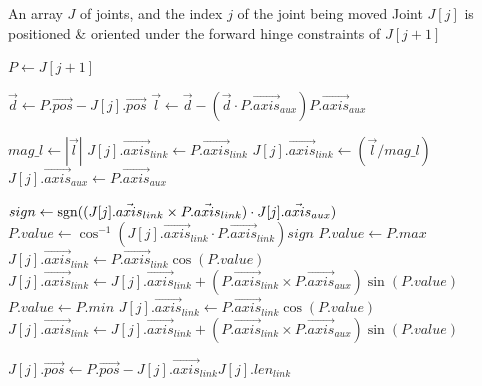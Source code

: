 \begin{algorithm}[h!]
\caption{Move Joint under Forward Hinge Constraints}
\label{alg:move_hinge}
\normalsize{
\begin{algorithmic}[1]
    \Require An array $J$ of joints, and the index $j$ of the joint being moved
    \Ensure Joint $J[j]$ is positioned \& oriented under the forward hinge constraints of $J[j+1]$

        \State $P\gets J[j+1]$
        \Statex

        \State $\vec{d}\gets P.\vec{pos}-J[j].\vec{pos}$
        \State $\vec{l}\gets\vec{d}-(\vec{d}\cdot P.\vec{axis}_{aux})P.\vec{axis}_{aux}$
        \Statex

        \State $mag\_l \gets |\vec{l}|$
            \State $J[j].\vec{axis}_{link}\gets P.\vec{axis}_{link}$
        \Else
            \State $J[j].\vec{axis}_{link}\gets (\vec{l}/mag\_l)$
        \EndIf
        \State $J[j].\vec{axis}_{aux}\gets P.\vec{axis}_{aux}$
        \Statex

        \State $sign\gets\operatorname{sgn}((J[j].\vec{axis}_{link}\times P.\vec{axis}_{link})\cdot J[j].\vec{axis}_{aux})$
        \State $P.value\gets\cos^{-1}(J[j].\vec{axis}_{link}\cdot P.\vec{axis}_{link})sign$
                \State $P.value\gets P.max$
                \State $J[j].\vec{axis}_{link}\gets P.\vec{axis}_{link}\cos(P.value)$
                \State $J[j].\vec{axis}_{link}\gets J[j].\vec{axis}_{link}+(P.\vec{axis}_{link}\times P.\vec{axis}_{aux})\sin(P.value)$
                \State $P.value\gets P.min$
                \State $J[j].\vec{axis}_{link}\gets P.\vec{axis}_{link}\cos(P.value)$
                \State $J[j].\vec{axis}_{link}\gets J[j].\vec{axis}_{link}+(P.\vec{axis}_{link}\times P.\vec{axis}_{aux})\sin(P.value)$
            \EndIf
        \EndIf
        \Statex

        \State $J[j].\vec{pos}\gets P.\vec{pos}-J[j].\vec{axis}_{link}J[j].len_{link}$
    \EndFunction
\end{algorithmic}
}
\end{algorithm}

